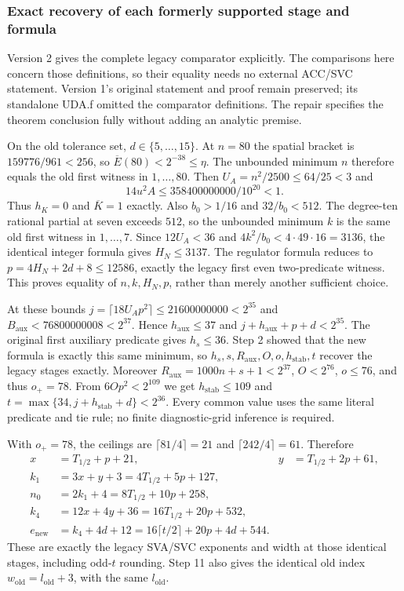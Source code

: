 \documentclass[11pt]{article}
\theoremstyle{plain}
\theoremstyle{definition}
\theoremstyle{remark}
\begin{document}
\subsubsection{Exact recovery of each formerly supported stage and formula}
Version 2 gives the complete legacy comparator explicitly. The comparisons
here concern those definitions, so their equality needs no external ACC/SVC
statement. Version 1's original statement and proof remain preserved; its
standalone UDA.f omitted the comparator definitions. The repair specifies
the theorem conclusion fully without adding an analytic premise.

On the old tolerance set, $d\in\{5,\ldots,15\}$. At $n=80$ the spatial
bracket is $159776/961<256$, so
$\overline E(80)<2^{-38}\le\eta$. The unbounded minimum $n$ therefore
equals the old first witness in $1,\ldots,80$.
Then $U_A=n^2/2500\le64/25<3$ and
\[
 14u^2A\le358400000000/10^{20}<1.
\]
Thus $h_K=0$ and $\overline K=1$ exactly. Also $b_0>1/16$ and
$32/b_0<512$. The degree-ten rational partial at seven exceeds $512$,
so the unbounded minimum $k$ is the same old first witness in $1,\ldots,7$.
Since $12U_A<36$ and $4k^2/b_0<4\cdot49\cdot16=3136$, the identical
integer formula gives $H_N\le3137$. The regulator formula reduces to
$p=4H_N+2d+8\le12586$, exactly the legacy first even two-predicate
witness. This proves equality of $n,k,H_N,p$, rather than merely another
sufficient choice.

At these bounds $j=\lceil18U_Ap^2\rceil\le21600000000<2^{35}$ and
$B_{\mathrm{aux}}<76800000008<2^{37}$.
Hence $h_{\mathrm{aux}}\le37$ and
$j+h_{\mathrm{aux}}+p+d<2^{35}$. The original first auxiliary predicate
gives $h_s\le36$. Step 2 showed that the new formula is exactly this same
minimum, so $h_s,s,R_{\mathrm{aux}},O,o,h_{\mathrm{stab}},t$ recover the
legacy stages exactly. Moreover
$R_{\mathrm{aux}}=1000n+s+1<2^{37}$, $O<2^{76}$, $o\le76$, and thus
$o_+=78$. From $6Op^2<2^{109}$ we get $h_{\mathrm{stab}}\le109$ and
$t=\max\{34,j+h_{\mathrm{stab}}+d\}<2^{36}$.
Every common value uses the same literal predicate and tie rule;
no finite diagnostic-grid inference is required.

With $o_+=78$, the ceilings are $\lceil81/4\rceil=21$ and
$\lceil242/4\rceil=61$. Therefore
\begin{align*}
 x&=T_{1/2}+p+21,&y&=T_{1/2}+2p+61,\\
 k_1&=3x+y+3=4T_{1/2}+5p+127,\\
 n_0&=2k_1+4=8T_{1/2}+10p+258,\\
 k_4&=12x+4y+36=16T_{1/2}+20p+532,\\
 e_{\mathrm{new}}&=k_4+4d+12=16\lceil t/2\rceil+20p+4d+544.
\end{align*}
These are exactly the legacy SVA/SVC exponents and width at those identical
stages, including odd-$t$ rounding. Step 11 also gives the identical old
index $w_{\mathrm{old}}=l_{\mathrm{old}}+3$, with the same $l_{\mathrm{old}}$.
\end{document}

